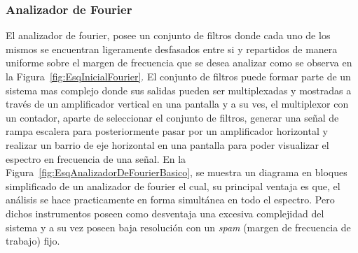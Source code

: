 \subsubsection{Analizador de Fourier }
    
    El analizador de fourier, posee un conjunto de filtros donde cada uno de los 
    mismos se encuentran ligeramente desfasados entre si y repartidos de manera 
    uniforme sobre el margen de frecuencia que se desea analizar como se observa
    en la Figura~\ref{fig:EsqInicialFourier}. El conjunto de filtros puede formar 
    parte de un sistema mas complejo donde sus salidas pueden ser multiplexadas 
    y mostradas a través de un amplificador vertical en una pantalla y a su ves, 
    el multiplexor con un contador, aparte de seleccionar el conjunto de filtros, 
    generar una señal de rampa escalera para posteriormente pasar por un 
    amplificador horizontal y realizar un barrio de eje horizontal en una pantalla 
    para poder visualizar el espectro en frecuencia de una señal. En la 
    Figura~\ref{fig:EsqAnalizadorDeFourierBasico}, se muestra un diagrama en bloques 
    simplificado de un analizador de fourier el cual, su principal 
    ventaja es que, el análisis se hace practicamente en forma simultánea en todo 
    el espectro. Pero dichos instrumentos poseen como desventaja una excesiva 
    complejidad del sistema y a su vez poseen baja resolución con un \textit{spam} 
    (margen de frecuencia de trabajo) fijo.
